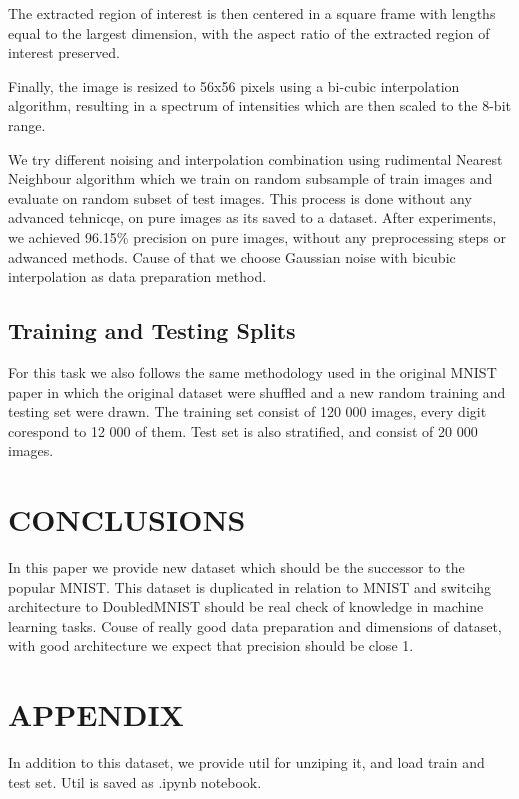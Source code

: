 \documentclass[letterpaper, 10 pt, conference]{ieeeconf}
\begin{document}
The extracted region of interest
is then centered in a square frame with lengths equal to the largest dimension, with the aspect ratio of the extracted region of interest preserved.

Finally, the image is resized to 56x56 pixels using a bi-cubic interpolation algorithm, resulting in a spectrum of intensities which are then scaled to the 8-bit range.

We try different noising and interpolation combination using rudimental Nearest Neighbour algorithm which we train on random subsample of train images and evaluate on random subset of test images. This process is done without any advanced tehnicqe, on pure images as its saved to a dataset. After experiments, we achieved 96.15\% precision on pure images, without any preprocessing steps or adwanced methods. Cause of that we choose Gaussian noise with bicubic interpolation as data preparation method. 

\subsection{Training and Testing Splits}

For this task we also follows the same methodology used in the original MNIST paper in which the original dataset were shuffled and a new random training and testing set were drawn. The training set consist of 120 000 images, every digit corespond to 12 000 of them. Test set is also stratified, and consist of 20 000 images.

\section{CONCLUSIONS}

In this paper we provide new dataset which should be the successor to the popular MNIST. This dataset is duplicated in relation to MNIST and switcihg architecture to DoubledMNIST should be real check of knowledge in machine learning tasks. Couse of really good data preparation and dimensions of dataset, with good architecture we expect that precision should be close 1.

\section*{APPENDIX}

In addition to this dataset, we provide util for unziping it, and load train and test set. Util is saved as .ipynb notebook.
\end{document}

